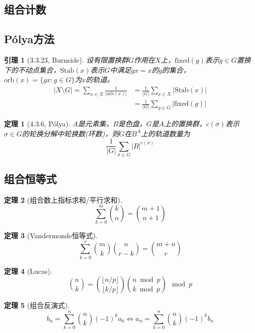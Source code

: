 \documentclass[landscape, a4paper]{article}
\theoremstyle{compact}
\newtheorem{theorem}{定理}
\newtheorem{lemma}{引理}
\begin{document}
\begin{multicols}{3}
\section{组合计数}
\subsection{P\'olya方法}
\begin{lemma}[3.3.23, Burnside]
	设有限置换群$G$作用在$X$上，$\text{fixed}(g)$表示$g \in G$置换下的不动点集合，$\text{Stab}(x)$表示$G$中满足$gx = x$的$g$的集合，$\text{orb}(x) = \{gx: g \in G\}$为$x$的轨道。\begin{align*}
	|X \setminus G| = \sum_{x \in X}\frac{1}{|\text{orb}(x)|} &= \frac{1}{|G|}\sum_{x \in X}|\text{Stab}(x)| \\&= \frac{1}{|G|}\sum_{g \in G}|\text{fixed}(g)|
	\end{align*}
\end{lemma}
\begin{theorem}[4.3.6, P\'olya]
	$A$是元素集，$B$是色盘，$G$是$A$上的置换群，$c(\sigma)$表示$\sigma \in G$的轮换分解中轮换数(环数)，则$G$在$B^A$上的轨道数量为$$\frac{1}{|G|}\sum_{\sigma \in G}|B|^{c(\sigma)}$$
\end{theorem}
\subsection{组合恒等式}
\begin{theorem}[组合数上指标求和/平行求和]
	$$\sum_{k=0}^{m}\binom{k}{n} = \binom{m+1}{n+1}$$
\end{theorem}
\begin{theorem}[Vandermonde恒等式]
	$$\sum_{k=0}^{r}\binom{m}{k}\binom{n}{r-k} = \binom{m+n}{r}$$
\end{theorem}
\begin{theorem}[Lucas]
	$$\binom{n}{k} = \binom{\lfloor n / p \rfloor}{\lfloor k / p \rfloor}\binom{n \bmod p}{k \bmod p} \mod p$$
\end{theorem}
\begin{theorem}[组合反演式]
	$$b_n = \sum_{k=0}^{n}\binom{n}{k}(-1)^ka_k \Leftrightarrow a_n = \sum_{k=0}^{n}\binom{n}{k}(-1)^{k}b_n$$
\end{theorem}

\end{multicols}
\end{document}
